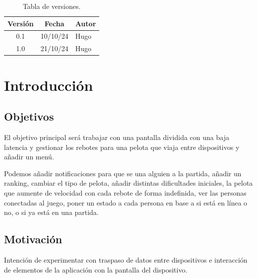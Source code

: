 \documentclass[a4paper,openright,12pt]{article}
\begin{document}

\tableofcontents

\vspace{5cm}

\begin{flushright}
\begin{table}[hbtp]
\begin{center}

\caption{Tabla de versiones.}
\label{tabla:versiones}
\small
\vspace{1ex}

\begin{tabular}{|c|c|l|}
\hline
Versión & Fecha & Autor \\
\hline \hline
0.1 & 10/10/24 & Hugo\\ \hline
1.0 & 21/10/24 & Hugo\\ \hline

\end{tabular}

\end{center}
\end{table}
\end{flushright}


\newpage
{}


\section{Introducción}\label{cap.introduccion}

\subsection{Objetivos}
El objetivo principal será trabajar con una pantalla dividida con una baja latencia y gestionar los rebotes para una pelota que viaja entre dispositivos y añadir un menú.

Podemos añadir notificaciones para que se una alguien a la partida, añadir un ranking, cambiar el tipo de pelota, añadir distintas dificultades iniciales, la pelota que aumente de velocidad con cada rebote de forma indefinida, ver las personas conectadas al juego, poner un estado a cada persona en base a si está en línea o no, o si ya está en una partida.
\subsection{Motivación}
Intención de experimentar con traspaso de datos entre dispositivos e interacción de elementos de la aplicación con la pantalla del dispositivo.
\end{document}
